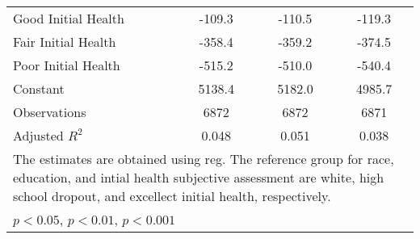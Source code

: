 \begin{table}[htbp]
\begin{tabular}{l*{3}{c}}
Good Initial Health&   -109.3\sym{***}&   -110.5\sym{***}&   -119.3\sym{***}\\
Fair Initial Health&   -358.4\sym{***}&   -359.2\sym{***}&   -374.5\sym{***}\\
Poor Initial Health&   -515.2\sym{***}&   -510.0\sym{***}&   -540.4\sym{***}\\
Constant        &   5138.4\sym{***}&   5182.0\sym{***}&   4985.7\sym{***}\\
Observations    &     6872         &     6872         &     6871         \\
Adjusted \(R^{2}\)&    0.048         &    0.051         &    0.038         \\
\multicolumn{4}{l}{\footnotesize The estimates are obtained using reg. The reference group for race, education, and intial health subjective assessment are white, high school dropout, and excellect initial health, respectively.}\\
\multicolumn{4}{l}{\footnotesize \sym{*} \(p<0.05\), \sym{**} \(p<0.01\), \sym{***} \(p<0.001\)}\\
\end{tabular}
\end{table}
